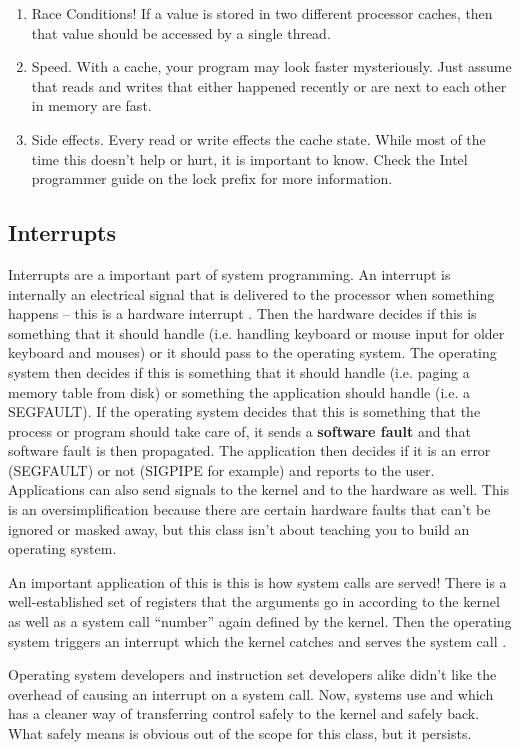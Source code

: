 \begin{enumerate}
\item Race Conditions! If a value is stored in two different processor caches, then that value should be accessed by a single thread.
\item Speed. With a cache, your program may look faster mysteriously. Just assume that reads and writes that either happened recently or are next to each other in memory are fast.
\item Side effects. Every read or write effects the cache state. While most of the time this doesn't help or hurt, it is important to know. Check the Intel programmer guide on the lock prefix for more information.
\end{enumerate}

\subsection{Interrupts}

Interrupts are a important part of system programming.
An interrupt is internally an electrical signal that is delivered to the processor when something happens -- this is a hardware interrupt \cite{redhat_hardware_int}.
Then the hardware decides if this is something that it should handle (i.e. handling keyboard or mouse input for older keyboard and mouses) or it should pass to the operating system.
The operating system then decides if this is something that it should handle (i.e. paging a memory table from disk) or something the application should handle (i.e. a SEGFAULT).
If the operating system decides that this is something that the process or program should take care of, it sends a \textbf{software fault} and that software fault is then propagated.
The application then decides if it is an error (SEGFAULT) or not (SIGPIPE for example) and reports to the user.
Applications can also send signals to the kernel and to the hardware as well.
This is an oversimplification because there are certain hardware faults that can't be ignored or masked away, but this class isn't about teaching you to build an operating system.

An important application of this is this is how system calls are served!
There is a well-established set of registers that the arguments go in according to the kernel as well as a system call ``number'' again defined by the kernel.
Then the operating system triggers an interrupt which the kernel catches and serves the system call \cite{garg_2006}.

Operating system developers and instruction set developers alike didn't like the overhead of causing an interrupt on a system call. Now, systems use  and  which has a cleaner way of transferring control safely to the kernel and safely back.
What safely means is obvious out of the scope for this class, but it persists.
